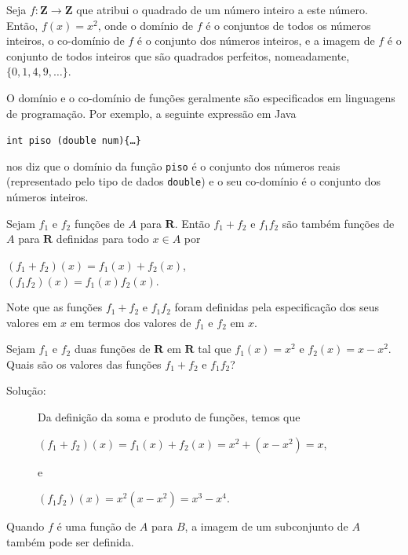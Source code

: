 \begin{exmp}
\label{exem325}
Seja $f: \mathbf{Z} \to \mathbf{Z}$ que atribui o quadrado de um número inteiro
a este número. Então, $f(x) = x^2$, onde o domínio de $f$ é o conjuntos de
todos os números inteiros, o co-domínio de $f$ é o conjunto dos números
inteiros, e a imagem de $f$ é o conjunto de todos inteiros que são quadrados
perfeitos, nomeadamente, $\{0,1,4,9,\ldots\}$.
\end{exmp}

\begin{exmp}
\label{exem326}
O domínio e o co-domínio de funções geralmente são especificados em linguagens
de programação. Por exemplo, a seguinte expressão em Java
\begin{center}
\texttt{int piso (double num)\{\ldots\}}
\end{center}
nos diz que o domínio da função \texttt{piso} é o conjunto dos números
reais (representado pelo tipo de dados \texttt{double}) e o seu co-domínio é o
conjunto dos números inteiros.
\end{exmp}


\begin{defn}
\label{def317}
Sejam $f_1$ e $f_2$ funções de $A$ para $\mathbf{R}$. Então $f_1 + f_2$ e
$f_1f_2$ são também funções de $A$ para $\mathbf{R}$ definidas para todo $x \in
A$ por

\begin{center}
$(f_1+f_2)(x) = f_1(x) + f_2(x)$,\\
$(f_1f_2)(x) = f_1(x)f_2(x)$.
\end{center}

Note que as funções $f_1+f_2$ e $f_1f_2$ foram definidas pela especificação dos
seus valores em $x$ em termos dos valores de $f_1$ e $f_2$ em $x$.
\end{defn}

\begin{exemp}
\label{exem327}
Sejam $f_1$ e $f_2$ duas funções de $\mathbf{R}$ em $\mathbf{R}$ tal que
$f_1(x) = x^2$ e $f_2(x) = x - x^2$. Quais são os valores das funções $f_1 +
f_2$ e $f_1f_2$?
\begin{description}
\item[Solução:] Da definição da soma e produto de funções, temos que
\begin{center}
$(f_1 + f_2)(x) = f_1(x) + f_2(x) = x^2 + (x - x^2) = x$,
\end{center}
e
\begin{center}
$(f_1f_2)(x)=x^2(x-x^2) = x^3-x^4$.
\end{center}
\end{description}
\end{exemp}
Quando $f$ é uma função de $A$ para $B$, a imagem de um subconjunto de $A$
também pode ser definida.


